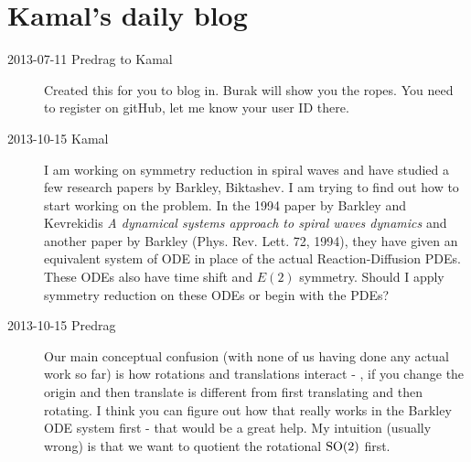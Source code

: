 
\chapter{Kamal's daily blog}
\label{c-dailyBlogKS}

\begin{description}
\item[2013-07-11  Predrag to Kamal] Created this for you to blog
in. Burak will show you the ropes. You need to register on gitHub, let me
know your user ID there.

\item[2013-10-15  Kamal] I am working on symmetry reduction in spiral waves and have studied a few research papers by Barkley, Biktashev. I am trying to find out how to start working on the problem. In the 1994 paper by Barkley and Kevrekidis {\em A dynamical systems approach to spiral waves dynamics} and another paper by Barkley (Phys. Rev. Lett. 72, 1994), they have given an equivalent system of ODE in place of the actual Reaction-Diffusion PDEs. These ODEs also have time shift and $E(2)$ symmetry. Should I apply symmetry reduction on these ODEs or begin with the PDEs?

\item[2013-10-15 Predrag] Our main conceptual confusion (with none of us having
done any actual work so far) is how rotations and translations interact - \ie, if you change the origin and then translate is different from first translating and then rotating. I think you can figure out how that really works in the Barkley ODE system first - that would be a great help. My intuition (usually wrong) is that we want to
quotient the rotational $\textrm{SO}(2)$ first. 


\end{description}
\renewcommand{\ssp}{a}
